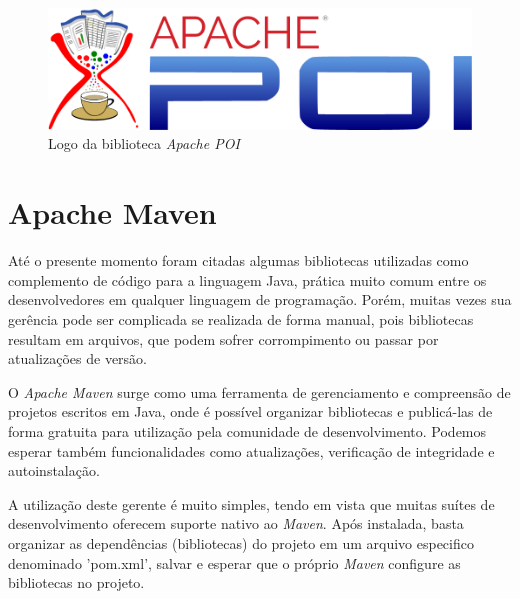 \documentclass[
	12pt,			%
	openright,		%
	oneside,	
	a4paper,		%
	english,		%
	brazil			%
]{abntex2/abntex2}  %
\begin{document}
			\begin{figure}[h]
				\begin{center}
					
					\caption{Logo da biblioteca \textit{Apache POI}}
					\label{apache-poi-img}
					
					\includegraphics[scale=0.35]{img/apache-poi}
					
					
				\end{center}
			\end{figure}

		\section{Apache Maven} \label{maven}
		
			Até o presente momento foram citadas algumas bibliotecas utilizadas como complemento de código para a linguagem Java, prática muito comum entre os desenvolvedores em qualquer linguagem de programação. Porém, muitas vezes sua gerência pode ser complicada se realizada de forma manual, pois bibliotecas resultam em arquivos, que podem sofrer corrompimento ou passar por atualizações de versão.
			
			O \textit{Apache Maven} \cite{maven} surge como uma ferramenta de gerenciamento e compreensão de projetos escritos em Java, onde é possível organizar bibliotecas e publicá-las de forma gratuita para utilização pela comunidade de desenvolvimento. Podemos esperar também funcionalidades como atualizações, verificação de integridade e autoinstalação.
			
			A utilização deste gerente é muito simples, tendo em vista que muitas suítes de desenvolvimento oferecem suporte nativo ao \textit{Maven}. Após instalada, basta organizar as dependências (bibliotecas) do projeto em um arquivo especifico denominado 'pom.xml', salvar e esperar que o próprio \textit{Maven} configure as bibliotecas no projeto.
\end{document}
